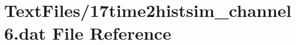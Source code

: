\hypertarget{17time2histsim__channel6_8dat}{}\section{Text\+Files/17time2histsim\+\_\+channel6.dat File Reference}
\label{17time2histsim__channel6_8dat}
